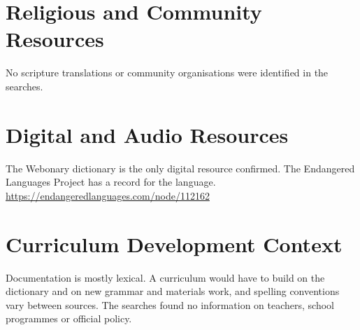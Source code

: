 \documentclass[12pt]{article}
\begin{document}
\section{Religious and Community Resources}
No scripture translations or community organisations were identified in the searches.

\section{Digital and Audio Resources}
The Webonary dictionary is the only digital resource confirmed. The Endangered Languages Project has a record for the language. \url{https://endangeredlanguages.com/node/112162}

\section{Curriculum Development Context}
Documentation is mostly lexical. A curriculum would have to build on the dictionary and on new grammar and materials work, and spelling conventions vary between sources. The searches found no information on teachers, school programmes or official policy.
\end{document}
